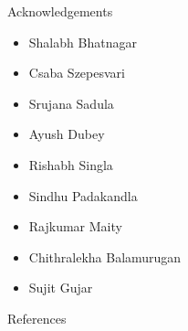 \documentclass[10pt,handout]{beamer}
\begin{document}
\begin{frame}[fragile]{Acknowledgements}
\begin{itemize}
\item Shalabh Bhatnagar
\item Csaba Szepesvari
\item Srujana Sadula
\item Ayush Dubey
\item Rishabh Singla
\item Sindhu Padakandla
\item Rajkumar Maity
\item Chithralekha Balamurugan
\item Sujit Gujar
\end{itemize}
\end{frame}

\begin{frame}[allowframebreaks]{References}


\end{frame}
\end{document}
